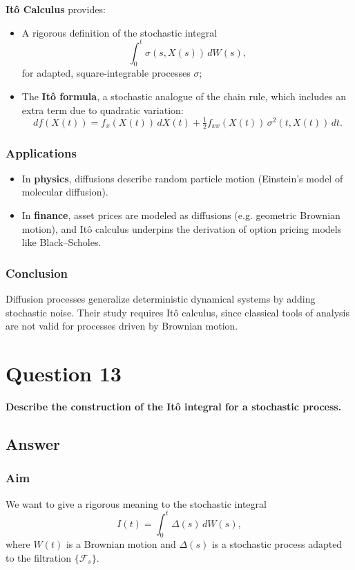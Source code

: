 \documentclass[12pt,a4paper]{book}
\theoremstyle{remark}
\newcommand{\F}{\mathcal{F}}          %
\begin{document}
\textbf{Itô Calculus} provides:
\begin{itemize}
    \item A rigorous definition of the stochastic integral
    \[
    \int_0^t \sigma(s,X(s))\,dW(s),
    \]
    for adapted, square-integrable processes $\sigma$;
    \item The \textbf{Itô formula}, a stochastic analogue of the chain rule, which includes an extra term due to quadratic variation:
    \[
    df(X(t)) = f_x(X(t))\,dX(t) + \tfrac{1}{2} f_{xx}(X(t))\,\sigma^2(t,X(t))\,dt.
    \]
\end{itemize}

\subsubsection*{Applications}
\begin{itemize}
    \item In \textbf{physics}, diffusions describe random particle motion (Einstein’s model of molecular diffusion).
    \item In \textbf{finance}, asset prices are modeled as diffusions (e.g. geometric Brownian motion), and Itô calculus underpins the derivation of option pricing models like Black–Scholes.
\end{itemize}

\subsubsection*{Conclusion}
Diffusion processes generalize deterministic dynamical systems by adding stochastic noise. Their study requires Itô calculus, since classical tools of analysis are not valid for processes driven by Brownian motion.


\newpage
\section{Question 13}
\textbf{Describe the construction of the Itô integral for a stochastic process.}

\subsection*{Answer}

\subsubsection*{Aim}
We want to give a rigorous meaning to the stochastic integral
\[
I(t) = \int_0^t \Delta(s)\,dW(s),
\]
where $W(t)$ is a Brownian motion and $\Delta(s)$ is a stochastic process adapted to the filtration $\{\F_s\}$.
\end{document}
